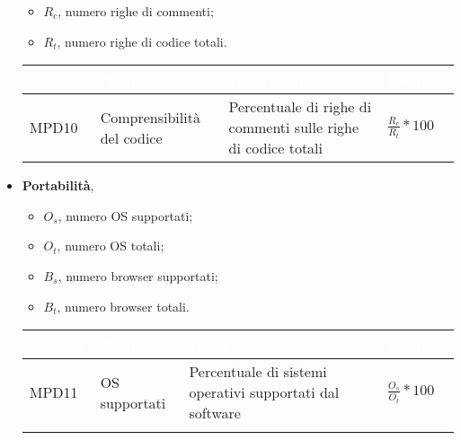 \begin{itemize}
            \begin{itemize}
                \item $R_c$, numero righe di commenti;
                \item $R_t$, numero righe di codice totali.
            \end{itemize}
            \renewcommand\arraystretch{1,5}
            \begin{center}
                \begin{tabular}{|p{1.7cm}|p{3cm}|p{4.5cm}|p{3cm}|} \hline
                  \rowcolor[HTML]{036400}
                  \textcolor[HTML]{FFFFFF}{\textbf{Metrica}} & \textcolor[HTML]{FFFFFF}{\textbf{Nome}} & \textcolor[HTML]{FFFFFF}{\textbf{Descrizione}} & \textcolor[HTML]{FFFFFF}{\textbf{Formula}}    \\ \hline
                  \rowcolor[HTML]{EFEFEF}
                  MPD10 & Comprensibilità del codice & Percentuale di righe di commenti sulle righe di codice totali & $\frac{R_c}{R_t}*100$  \\ \hline
                \end{tabular}
            \end{center}
            \renewcommand\arraystretch{1}
        \item \textbf{Portabilità},
            \begin{itemize}
                \item $O_s$, numero OS supportati;
                \item $O_t$, numero OS totali;
                \item $B_s$, numero browser supportati;
                \item $B_t$, numero browser totali.
            \end{itemize}
            \renewcommand\arraystretch{1,5}
            \begin{center}
                \begin{tabular}{|p{1.7cm}|p{3cm}|p{4.5cm}|p{3cm}|} \hline
                  \rowcolor[HTML]{036400}
                  \textcolor[HTML]{FFFFFF}{\textbf{Metrica}} & \textcolor[HTML]{FFFFFF}{\textbf{Nome}} & \textcolor[HTML]{FFFFFF}{\textbf{Descrizione}} & \textcolor[HTML]{FFFFFF}{\textbf{Formula}}    \\ \hline
                  \rowcolor[HTML]{EFEFEF}
                  MPD11 & OS supportati & Percentuale di sistemi operativi supportati dal software & $\frac{O_s}{O_t}*100$  \\ \hline
                  \rowcolor[HTML]{C0C0C0}

\end{tabular}
\end{center}
\end{itemize}
